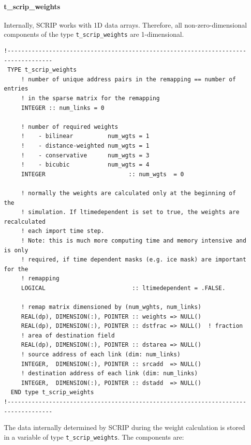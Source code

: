\documentclass[11pt,twoside]{article}
\begin{document}
\paragraph{\bf \rm t\_scrip\_weights\\ \label{Tsweights}}
Internally, SCRIP works with 1D data arrays. Therefore, all
non-zero-dimensional components of the type  \verb|t_scrip_weights|
are 1-dimensional.
\begin{verbatim}
!-----------------------------------------------------------------------------------
 TYPE t_scrip_weights
     ! number of unique address pairs in the remapping == number of entries
     ! in the sparse matrix for the remapping
     INTEGER :: num_links = 0

     ! number of required weights 
     !    - bilinear          num_wgts = 1
     !    - distance-weighted num_wgts = 1
     !    - conservative      num_wgts = 3
     !    - bicubic           num_wgts = 4
     INTEGER                        :: num_wgts  = 0

     ! normally the weights are calculated only at the beginning of the
     ! simulation. If ltimedependent is set to true, the weights are recalculated
     ! each import time step. 
     ! Note: this is much more computing time and memory intensive and is only
     ! required, if time dependent masks (e.g. ice mask) are important for the 
     ! remapping
     LOGICAL                         :: ltimedependent = .FALSE.

     ! remap matrix dimensioned by (num_wghts, num_links)
     REAL(dp), DIMENSION(:), POINTER :: weights => NULL()
     REAL(dp), DIMENSION(:), POINTER :: dstfrac => NULL()  ! fraction 
     ! area of destination field
     REAL(dp), DIMENSION(:), POINTER :: dstarea => NULL()
     ! source address of each link (dim: num_links)
     INTEGER,  DIMENSION(:), POINTER :: srcadd  => NULL()
     ! destination address of each link (dim: num_links)
     INTEGER,  DIMENSION(:), POINTER :: dstadd  => NULL()
  END type t_scrip_weights
!-----------------------------------------------------------------------------------
\end{verbatim}
The data internally determined by SCRIP during the weight calculation
is stored in a variable of type \verb|t_scrip_weights|. The components
are:
\end{document}
